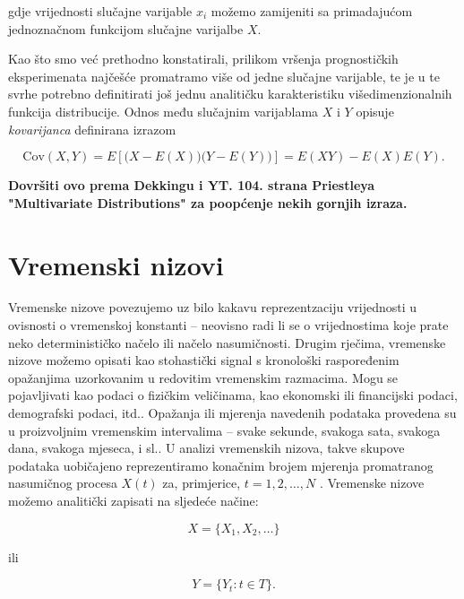 \documentclass[a4paper,12pt,oneside]{memoir}
\begin{document}
                gdje vrijednosti slučajne varijable $x_i$ možemo zamijeniti sa primadajućom jednoznačnom funkcijom slučajne varijalbe $X$.

                Kao što smo već prethodno konstatirali, prilikom vršenja prognostičkih eksperimenata najčešće promatramo više od jedne slučajne varijable, te je u te svrhe potrebno definitirati još jednu analitičku karakteristiku višedimenzionalnih funkcija distribucije. Odnos među slučajnim varijablama $X$ i $Y$ opisuje \textit{kovarijanca} \cite{Bahovec} definirana izrazom

                \begin{equation}
                    \mathrm{Cov}(X,Y)=E\left[\big(X-E(X)\big)\big(Y-E(Y)\big)\right]=E(XY)-E(X)E(Y).
                    \label{eq:covariance}
                \end{equation}

                \textbf{Dovršiti ovo prema Dekkingu i YT. 104. strana Priestleya "Multivariate Distributions" za poopćenje nekih gornjih izraza.}

        \section{Vremenski nizovi}

            Vremenske nizove povezujemo uz bilo kakavu reprezentzaciju vrijednosti u ovisnosti o vremenskoj konstanti -- neovisno radi li se o vrijednostima koje prate neko determinističko načelo ili načelo nasumičnosti. Drugim rječima, vremenske nizove možemo opisati kao stohastički signal s kronološki raspoređenim opažanjima uzorkovanim u redovitim vremenskim razmacima. Mogu se pojavljivati kao podaci o fizičkim veličinama, kao ekonomski ili financijski podaci, demografski podaci, itd.. Opažanja ili mjerenja navedenih podataka provedena su u proizvoljnim vremenskim intervalima -- svake sekunde, svakoga sata, svakoga dana, svakoga mjeseca, i sl.. U analizi vremenskih nizova, takve skupove podataka uobičajeno reprezentiramo konačnim brojem mjerenja promatranog nasumičnog procesa $X(t)$ za, primjerice, $t=1,2,\ldots,N$ \cite{Priestley}. Vremenske nizove možemo analitički zapisati na sljedeće načine:

            \begin{equation}
                X=\{X_1,X_2,\ldots\}
            \end{equation}

            ili

            \begin{equation}
                Y=\{Y_t: t\in T\}.
            \end{equation}
            
\end{document}
